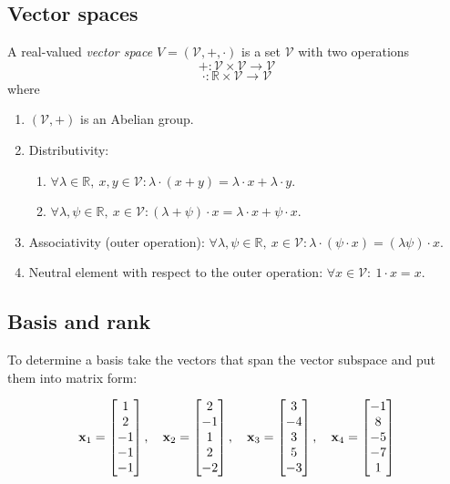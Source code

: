 \subsection{Vector spaces}
\begin{definition}
A real-valued \emph{vector space} \( V = (\mathcal{V}, +, \cdot) \) is a set \(\mathcal{V}\) with two operations
\[
+ : \mathcal{V} \times \mathcal{V} \to \mathcal{V}
\tag{2.62}
\]
\[
\cdot : \mathbb{R} \times \mathcal{V} \to \mathcal{V}
\tag{2.63}
\]
where
\begin{enumerate}
    \item \((\mathcal{V}, +)\) is an Abelian group.
    \item Distributivity:
    \begin{enumerate}
        \item \(\forall \lambda \in \mathbb{R},\ x,y \in \mathcal{V}: 
        \lambda \cdot (x + y) = \lambda \cdot x + \lambda \cdot y\).
        \item \(\forall \lambda, \psi \in \mathbb{R},\ x \in \mathcal{V}:
        (\lambda + \psi) \cdot x = \lambda \cdot x + \psi \cdot x\).
    \end{enumerate}
    \item Associativity (outer operation): 
    \(\forall \lambda, \psi \in \mathbb{R},\ x \in \mathcal{V}:
    \lambda \cdot (\psi \cdot x) = (\lambda \psi) \cdot x\).
    \item Neutral element with respect to the outer operation:
    \(\forall x \in \mathcal{V}:\ 1 \cdot x = x\).
\end{enumerate}
\end{definition}

\subsection{Basis and rank}
To determine a basis take the vectors that span the vector subspace and put them into matrix form:

\[
  \vb x_1 =
  \begin{bmatrix}
    1\\2\\-1\\-1\\-1
  \end{bmatrix}, \quad
  \vb x_2 =
  \begin{bmatrix}
    2\\-1\\1\\2\\-2
  \end{bmatrix}, \quad
  \vb x_3 =
  \begin{bmatrix}
    3\\-4\\3\\5\\-3
  \end{bmatrix}, \quad
  \vb x_4 =
  \begin{bmatrix}
    -1\\8\\-5\\-7\\1
  \end{bmatrix}
\]

